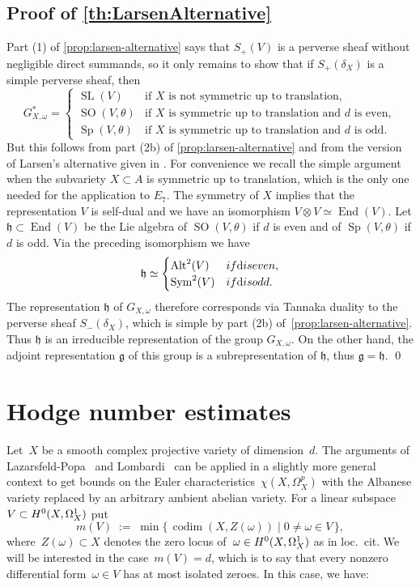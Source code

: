 \documentclass[a4paper]{amsart}
\newcommand{\rH}{\textup{H}}
\newcommand{\iso}{\simeq}
\DeclareMathOperator{\End}{End}
\DeclareMathOperator{\Sym}{Sym}
\DeclareMathOperator{\SL}{SL}
\DeclareMathOperator{\SO}{SO}
\DeclareMathOperator{\Sp}{Sp}
\DeclareMathOperator{\codim}{codim}
\DeclareMathOperator{\Alt}{Alt}
\theoremstyle{plain}
\theoremstyle{definition}
\numberwithin{equation}{section}
\begin{document}
\subsection{Proof of \cref{th:LarsenAlternative}} \label{sec:proof-of-LarsenAlternative} 
Part (1) of \cref{prop:larsen-alternative} says that $S_+(V)$ is a perverse sheaf without negligible direct summands, so it only remains to show that if $S_+(\delta_X)$ is a simple perverse sheaf, then
%
\[
G_{X, \omega}^\ast = 
\begin{cases}
\SL(V) & \text{if $X$ is not symmetric up to translation}, \\
\SO(V, \theta) & \text{if $X$ is symmetric up to translation and $d$ is even}, \\
\Sp(V, \theta) & \text{if $X$ is symmetric up to translation and  $d$ is odd}.
\end{cases}
\]
%
But this follows from part (2b) of \cref{prop:larsen-alternative} and from the version of Larsen's alternative given in \cite[lemma 3.7]{JKLM}. For convenience we recall the simple argument when the subvariety $X\subset A$ is symmetric up to translation, which is the only one needed for the application to $E_7$. The symmetry of $X$ implies that the representation $V$ is self-dual and we have an isomorphism $V \otimes V \iso  \End(V)$. Let $\mathfrak{h} \subset \End(V)$ be the Lie algebra of $\SO(V, \theta)$ if $d$ is even and of $\Sp(V, \theta)$ if $d$ is odd. Via the preceding isomorphism we have
\[ 
\mathfrak{h} \iso
\begin{cases}
\Alt^2(V) & \textup{if $d$ is even},\\
\Sym^2(V) & \textup{if $d$ is odd}.
\end{cases}
\]
The representation $\mathfrak{h}$ of $G_{X, \omega}$ therefore corresponds via Tannaka duality to the perverse sheaf $S_-(\delta_X)$, which is simple by part (2b) of~\cref{prop:larsen-alternative}. Thus $\mathfrak{h}$ is an irreducible representation of the group $G_{X,\omega}$. On the other hand, the adjoint representation $\mathfrak{g}$ of this group is a subrepresentation of $\mathfrak{h}$, thus $\mathfrak{g} = \mathfrak{h}$.
\qed

\appendix

\section{Hodge number estimates} \label{sec:HodgeEstimates}

Let~$X$ be a smooth complex projective variety of dimension~$d$. The arguments of Lazarsfeld-Popa~\cite[th.~C(iii)]{LazarsfeldPopa} and Lombardi~\cite[cor.~2.3]{Lombardi13} can be applied in a slightly more general context to get bounds on the Euler characteristics~$\chi(X, \Omega^p_X)$ with the Albanese variety replaced by an arbitrary ambient abelian variety. For a linear subspace~$V\subset \rH^0(X, \Omega^1_X)$ put
%
\[
 m(V) \;:=\; \min \bigl\{ \, \codim(X, Z(\omega)) \mid 0\neq \omega \in V \, \bigr\}, 
\]
%
where~$Z(\omega) \subset X$ denotes the zero locus of~$\omega \in \rH^0(X, \Omega^1_X)$ as in loc.~cit. We will be interested in the case~$m(V)=d$, which is to say that every nonzero differential form~$\omega \in V$ has at most isolated zeroes. In this case, we have: 
\end{document}
